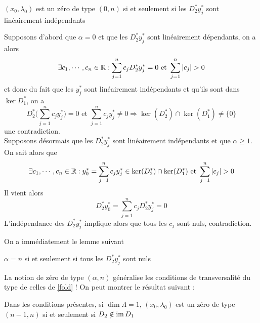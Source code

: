 \documentclass[memoire.tex]{subfiles}
\begin{document}
\begin{proposition}\label{zeronlinINd}
    $(x_0,\lambda_0)$ est un zéro de type $(0,n)$ si et seulement si les $D_2^{*}y_j^{*}$ sont linéairement indépendants
\end{proposition}
\begin{preuve}
    Supposons d'abord que $\alpha=0$ et que les $D_2^{*}y_j^{*}$ sont linéairement dépendants,
    on a alors 
    \begin{equation*}
        \exists c_1,\cdots,c_n\in\R: \sum_{j=1}^n c_jD_2^{*}y_j^{*}=0\text{ et } \sum_{j=1}^n |c_j|>0
    \end{equation*}
    et donc du fait que les $y^{*}_j$ sont linéairement indépendants et qu'ils sont dans $\ker D_1^{*}$, on  a 
    \begin{equation*}
        D_2^{*} \Bigg(\sum_{j=1}^n c_jy_j^{*}
        \Bigg)=0\text{ et } \sum_{j=1}^n c_jy_j^{*}\neq 
        0\Rightarrow  \ker (D_2^{*})\cap \ker 
        (D_1^{*})\neq \{0\}
    \end{equation*}
    une contradiction.\\
    Supposons désormais que les 
    $D_2^{*}y_j^{*}$ sont linéairement indépendants et que $\alpha\geq 1$. On sait alors que 
    \begin{equation*}
    \exists c_1,\cdots,c_n\in\R:
    y^{*}_0=\sum_{j=1}^n c_j y^{*}_j\in\ker (D_2^{*})
    \cap \ker (D_1^{*})\text{ et } \sum_{j=1}^n |
    c_j|>0
    \end{equation*}
    Il vient alors
    \begin{equation*}
        D_2^{*}y^{*}_0=\sum_ {j=1}^n c_jD_2^{*}  y^{*}_j=0
    \end{equation*} 
   L'indépendance des $D_2^*y_j^*$ implique alors que tous les $c_j$ sont nuls, contradiction.

\end{preuve}
On a immédiatement le lemme suivant 
\begin{lemme}
$\alpha=n$ si et seulement si tous les $D_2^{*} y_j^{*}$ sont nuls
\end{lemme}
\begin{remarque}
    La notion de zéro de type $(\alpha,n)$ généralise les conditions de transversalité du type de celles de \ref{fold} ! 
    On peut montrer le résultat suivant : 
\end{remarque}
\begin{lemme}
    Dans les conditions présentes, si $\dim \Lambda=1$, $(x_0,\lambda_0)$ est un zéro de type $(n-1,n)$ si et seulement si $D_2\notin \operatorname{im} D_1$ 
\end{lemme}
\end{document}

